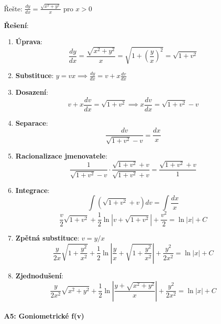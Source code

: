 \begin{example}
Řešte: $\frac{dy}{dx} = \frac{\sqrt{x^2 + y^2}}{x}$ pro $x > 0$
\vspace{0.3\baselineskip}

\textbf{Řešení}: 
\begin{enumerate}
\item \textbf{Úprava}:
\[
\frac{dy}{dx} = \frac{\sqrt{x^2 + y^2}}{x} = \sqrt{1 + \left(\frac{y}{x}\right)^2} = \sqrt{1 + v^2}
\]

\item \textbf{Substituce}: $y = vx \implies \frac{dy}{dx} = v + x\frac{dv}{dx}$

\item \textbf{Dosazení}:
\[
v + x\frac{dv}{dx} = \sqrt{1 + v^2} \implies x\frac{dv}{dx} = \sqrt{1 + v^2} - v
\]

\item \textbf{Separace}:
\[
\frac{dv}{\sqrt{1 + v^2} - v} = \frac{dx}{x}
\]

\item \textbf{Racionalizace jmenovatele}:
\[
\frac{1}{\sqrt{1 + v^2} - v} \cdot \frac{\sqrt{1 + v^2} + v}{\sqrt{1 + v^2} + v} = \frac{\sqrt{1 + v^2} + v}{1}
\]

\item \textbf{Integrace}:
\[
\int (\sqrt{1 + v^2} + v)dv = \int \frac{dx}{x}
\]
\[
\frac{v}{2}\sqrt{1 + v^2} + \frac{1}{2}\ln|v + \sqrt{1 + v^2}| + \frac{v^2}{2} = \ln|x| + C
\]

\item \textbf{Zpětná substituce}: $v = y/x$
\[
\frac{y}{2x}\sqrt{1 + \frac{y^2}{x^2}} + \frac{1}{2}\ln\left|\frac{y}{x} + \sqrt{1 + \frac{y^2}{x^2}}\right| + \frac{y^2}{2x^2} = \ln|x| + C
\]

\item \textbf{Zjednodušení}:
\[
\frac{y}{2x^2}\sqrt{x^2 + y^2} + \frac{1}{2}\ln\left|\frac{y + \sqrt{x^2 + y^2}}{x}\right| + \frac{y^2}{2x^2} = \ln|x| + C
\]
\end{enumerate}
\end{example}

\vspace{0.8\baselineskip}

\paragraph*{A5: Goniometrické f(v)}

